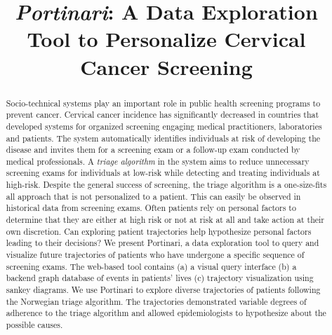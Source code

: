 \documentclass[10pt, conference]{IEEEtran}
\begin{document}
\title{\emph{Portinari}: A Data Exploration Tool to Personalize Cervical Cancer Screening}


\author{
	
	
	
}


\maketitle


\begin{abstract}
Socio-technical systems play an important role in public health screening programs to prevent cancer. Cervical cancer incidence  has significantly decreased in countries that developed systems for organized screening engaging medical practitioners, laboratories and patients. The  system  automatically identifies individuals at risk of developing the disease and invites them for a screening exam or a follow-up exam conducted by medical professionals. A \emph{triage algorithm} in the system aims to reduce unnecessary screening exams for individuals at low-risk while detecting and treating individuals at high-risk. Despite the general success of screening,  the triage algorithm is a one-size-fits all approach that is not personalized to a patient. This can easily be observed in historical data from screening exams. Often patients rely on personal factors to determine that they are either at high risk or not at risk at all and take action at their own discretion. Can exploring patient trajectories help hypothesize personal factors leading to their decisions?  We present Portinari, a data exploration tool to query and visualize future trajectories of patients who have undergone a specific sequence of screening exams. The web-based tool contains (a) a visual query interface (b) a backend graph database of events in patients' lives (c) trajectory visualization using sankey diagrams. We use Portinari to explore diverse trajectories of patients following the Norwegian triage algorithm. The trajectories demonstrated variable degrees of adherence to the triage algorithm and allowed epidemiologists to hypothesize about the possible causes.
\end{abstract}
\end{document}
